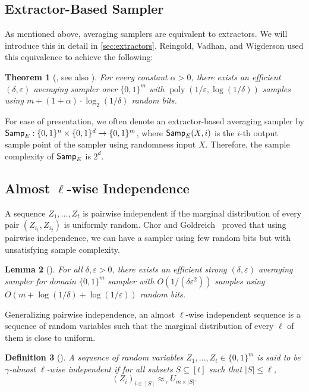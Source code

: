 \documentclass[11pt,letterpaper]{article}
\newtheorem{theorem}{Theorem}
\newtheorem{lemma}[theorem]{Lemma}
\newtheorem{definition}[theorem]{Definition}
\DeclareMathOperator*{\poly}{poly}
\newcommand{\eps}{\varepsilon}
\newcommand{\1}{\mathbbm{1}}
\newcommand{\zo}{\{0, 1\}}
\newcommand{\Smp}{\textup{\textsf{Samp}}}
\begin{document}
\subsection{Extractor-Based Sampler}
As mentioned above, averaging samplers are equivalent to extractors. We will introduce this in detail in \cref{sec:extractors}.
Reingold, Vadhan, and Wigderson used this equivalence to achieve the following:

\begin{theorem}[, see also ]
\label{thm:optimal_existing_sampler}
For every constant $\alpha > 0$, there exists an efficient $(\delta, \eps)$ averaging sampler over $\zo^m$ with $\poly(1 / \eps, \log(1/\delta))$ samples using $m + (1 + \alpha) \cdot \log_2(1/\delta)$ random bits.
\end{theorem}
For ease of presentation, we often denote an extractor-based averaging sampler by $\Smp_{E} : \zo^n \times \zo^{d} \to \zo^m$, where $\Smp_{E}(X, i)$ is the $i$-th output sample point of the sampler using randomness input $X$. Therefore, the sample complexity of $\Smp_{E}$ is $2^d$.





\subsection{Almost $\ell$-wise Independence}
A sequence $Z_1, \dots, Z_t$ is pairwise independent if the marginal distribution of every pair $(Z_{i_1}, Z_{i_2})$ is uniformly random.
Chor and Goldreich~\cite{CG89} proved that using pairwise independence, we can have a sampler using few random bits but with unsatisfying sample complexity.
\begin{lemma}[\cite{CG89}]
    \label{lem:pairwise_independence}
    For all $\delta, \eps > 0$, there exists an efficient strong $(\delta, \eps)$ averaging sampler for domain $\zo^m$ sampler with $O(1 / (\delta \eps^2))$ samples using $O(m + \log(1/\delta) + \log(1 / \eps))$ random bits.
\end{lemma}

Generalizing pairwise independence, an almost $\ell$-wise independent  sequence is a sequence of random variables such that the marginal distribution of every $\ell$ of them is close to uniform. 

\begin{definition}[\cite{NN_almost_k_wise}]
A sequence of random variables $Z_1, \dots, Z_t \in \zo^m$  is said to be $\gamma$-almost $\ell$-wise independent  if for all subsets $S \subseteq [t]$ such that $|S| \le \ell$, \[
    (Z_i)_{i \in [S]} \approx_{\gamma} U_{m \times |S|}.
\]
\end{definition}
\end{document}
